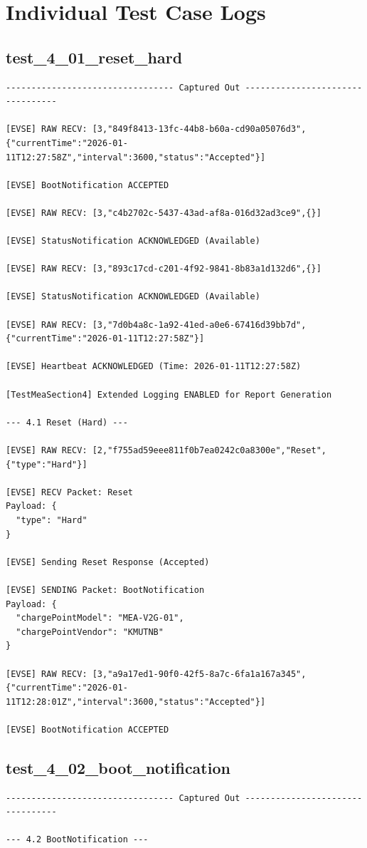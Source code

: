 \documentclass{article}
\begin{document}
\section{Individual Test Case Logs}\subsection*{test\_4\_01\_reset\_hard}
\begin{lstlisting}
--------------------------------- Captured Out ---------------------------------

[EVSE] RAW RECV: [3,"849f8413-13fc-44b8-b60a-cd90a05076d3",{"currentTime":"2026-01-11T12:27:58Z","interval":3600,"status":"Accepted"}]

[EVSE] BootNotification ACCEPTED

[EVSE] RAW RECV: [3,"c4b2702c-5437-43ad-af8a-016d32ad3ce9",{}]

[EVSE] StatusNotification ACKNOWLEDGED (Available)

[EVSE] RAW RECV: [3,"893c17cd-c201-4f92-9841-8b83a1d132d6",{}]

[EVSE] StatusNotification ACKNOWLEDGED (Available)

[EVSE] RAW RECV: [3,"7d0b4a8c-1a92-41ed-a0e6-67416d39bb7d",{"currentTime":"2026-01-11T12:27:58Z"}]

[EVSE] Heartbeat ACKNOWLEDGED (Time: 2026-01-11T12:27:58Z)

[TestMeaSection4] Extended Logging ENABLED for Report Generation

--- 4.1 Reset (Hard) ---

[EVSE] RAW RECV: [2,"f755ad59eee811f0b7ea0242c0a8300e","Reset",{"type":"Hard"}]

[EVSE] RECV Packet: Reset
Payload: {
  "type": "Hard"
}

[EVSE] Sending Reset Response (Accepted)

[EVSE] SENDING Packet: BootNotification
Payload: {
  "chargePointModel": "MEA-V2G-01",
  "chargePointVendor": "KMUTNB"
}

[EVSE] RAW RECV: [3,"a9a17ed1-90f0-42f5-8a7c-6fa1a167a345",{"currentTime":"2026-01-11T12:28:01Z","interval":3600,"status":"Accepted"}]

[EVSE] BootNotification ACCEPTED
\end{lstlisting}
\subsection*{test\_4\_02\_boot\_notification}
\begin{lstlisting}
--------------------------------- Captured Out ---------------------------------

--- 4.2 BootNotification ---
\end{lstlisting}
\end{document}
